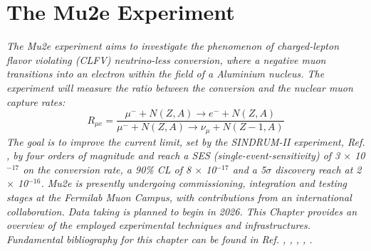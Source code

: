 \chapter{The Mu2e Experiment}\label{mu2echapter}
\textit{
The Mu2e experiment aims to investigate the phenomenon of charged-lepton flavor violating (CLFV) neutrino-less conversion, where a negative muon transitions into an electron within the field of a Aluminium nucleus. The experiment will measure the ratio between the conversion and the nuclear muon capture rates:
\begin{equation}\label{rmue}
R_{\mu e}=\frac{\mu^{-}+N(Z, A) \rightarrow e^{-}+N(Z, A)}{\mu^{-}+N(Z, A) \rightarrow \nu_\mu+N(Z-1, A)}
\end{equation}
The goal is to improve the current limit, set by the SINDRUM-II experiment, Ref. \cite{SINDRUMII:2006dvw}, by
four orders of magnitude and reach a SES (single-event-sensitivity) of 3 $\times$ 10$^{-17}$ on the
conversion rate, a 90\% CL of 8 $\times$ 10$^{-17}$ and a 5$\sigma$ discovery reach at 2 $\times$ 10$^{-16}$.
Mu2e is presently undergoing commissioning, integration and testing stages at the Fermilab Muon Campus, 
with contributions from an international collaboration. Data taking is planned to begin in 2026. 
This Chapter provides an overview of the employed experimental techniques and infrastructures. 
Fundamental bibliography for this chapter can be found in Ref. \cite{bartoszek2015mu2e}, 
\cite{bobbb}, \cite{Bernstein_2013}, \cite{Kargiantoulakis_2020}, \cite{universe9010054}.}
